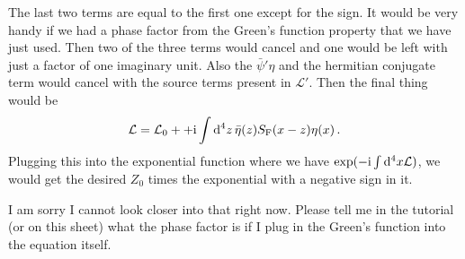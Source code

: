 \documentclass[11pt, english, fleqn, DIV=15, headinclude]{scrartcl}
\begin{document}
The last two terms are equal to the first one except for the sign. It
would be very handy if we had a phase factor from the Green's function property
that we have just used. Then two of the three terms would cancel and one would
be left with just a factor of one imaginary unit. Also the $\bar\psi' \eta$ and
the hermitian conjugate term would cancel with the source terms present in
$\mathcal L'$. Then the final thing would be
\[
    \mathcal L = \mathcal L_0 + 
    + \mathrm i \int \mathop{}\!\mathrm d^4 z \, \bar\eta(z) S_\text F(x - z) \eta(x) \,.
\]
Plugging this into the exponential function where we have $\exp(- \mathrm i \int
\mathop{}\!\mathrm d^4 x \mathcal L)$, we would get the desired $Z_0$ times the exponential
with a negative sign in it.

I am sorry I cannot look closer into that right now. Please tell me in the
tutorial (or on this sheet) what the phase factor is if I plug in the Green's
function into the equation itself.
\end{document}
